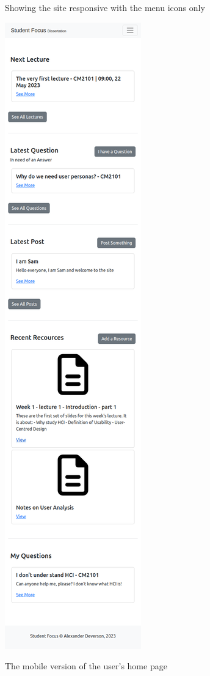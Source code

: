 Showing the site responsive with the menu icons only

\includegraphics[scale=0.20]{images/application/44 - mobile_home.png}

The mobile version of the user's home page

